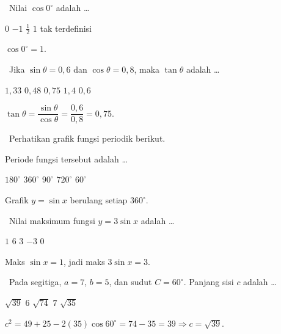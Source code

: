 \documentclass[11pt,a4paper]{exam}
\newcommand{\Fund}{{\footnotesize\textsf{\textcolor{hijau}{[Fundamental]}}}\ }
\newcommand{\Inter}{{\footnotesize\textsf{\textcolor{biru}{[Intermediate]}}}\ }
\begin{document}
\begin{questions}
\question \Fund Nilai $\cos 0^\circ$ adalah \dots
\begin{choices}
\choice $0$ \choice $-1$ \choice $\tfrac{1}{2}$ \CorrectChoice $1$ \choice tak terdefinisi
\end{choices}
\begin{solution}$\cos 0^\circ = 1.$\end{solution}

\question \Inter Jika $\sin\theta = 0{,}6$ dan $\cos\theta = 0{,}8$, maka $\tan\theta$ adalah \dots
\begin{choices}
\choice $1{,}33$ \choice $0{,}48$ \CorrectChoice $0{,}75$ \choice $1{,}4$ \choice $0{,}6$
\end{choices}
\begin{solution}$\tan\theta = \dfrac{\sin\theta}{\cos\theta} = \dfrac{0{,}6}{0{,}8} = 0{,}75.$\end{solution}

\question \Inter Perhatikan grafik fungsi periodik berikut.

\begin{center}
\end{center}

Periode fungsi tersebut adalah \dots
\begin{choices}
\choice $180^\circ$ \CorrectChoice $360^\circ$ \choice $90^\circ$ \choice $720^\circ$ \choice $60^\circ$
\end{choices}
\begin{solution}Grafik $y=\sin x$ berulang setiap $360^\circ$.\end{solution}

\question \Inter Nilai maksimum fungsi $y = 3\sin x$ adalah \dots
\begin{choices}
\choice $1$ \choice $6$ \CorrectChoice $3$ \choice $-3$ \choice $0$
\end{choices}
\begin{solution}Maks $\sin x = 1$, jadi maks $3\sin x = 3.$\end{solution}

\question \Inter Pada segitiga, $a=7$, $b=5$, dan sudut $C = 60^\circ$. Panjang sisi
$c$ adalah \dots
\begin{choices}
\CorrectChoice $\sqrt{39}$ \choice $6$ \choice $\sqrt{74}$ \choice $7$ \choice $\sqrt{35}$
\end{choices}
\begin{solution}$c^{2} = 49+25-2(35)\cos 60^\circ = 74-35 = 39 \Rightarrow c=\sqrt{39}.$\end{solution}


\end{questions}
\end{document}

